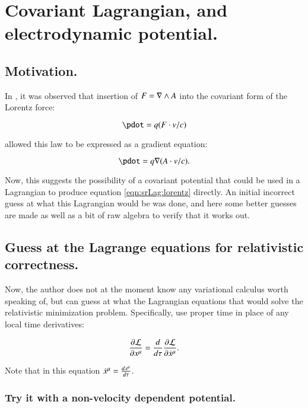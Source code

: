 \chapter{Covariant Lagrangian, and electrodynamic potential.}\label{chap:PJSrLagrangian}
\date{August 21, 2008.  srLagrangian.tex}

\section{Motivation. }

In , it was observed that insertion of $F = \nabla \wedge A$ into
the covariant form of the Lorentz force:

\begin{equation}\label{eqn:srLag:lorentz}
\pdot = q (F \cdot v/c)
\end{equation}

allowed this law to be expressed as a gradient equation:

\begin{equation}
\pdot = q \grad (A \cdot v/c).
\end{equation}

Now, this suggests the possibility of a covariant potential that could be 
used in a Lagrangian to produce equation \ref{eqn:srLag:lorentz} directly.  An
initial incorrect guess at what this Lagrangian would be was done, and
here some better guesses are made as well as a bit of raw algebra to verify
that it works out.

\section{Guess at the Lagrange equations for relativistic correctness. }

Now, the author does not at the moment know any variational calculus worth
speaking of, but can guess at what the Lagrangian equations that would 
solve the relativistic minimization problem.  Specifically, use proper
time in place of any local time derivatives:

\begin{equation}\label{eqn:srLag:properLagrange}
\frac{\partial \mathcal{L}}{\partial x^{\mu}} = 
\frac{d}{d\tau} \frac{\partial \mathcal{L}}{\partial \dot{x}^{\mu}}.
\end{equation}

Note that in this equation $\dot{x}^{\mu} = \frac{d x^{\mu}}{d\tau}$.

\subsection{Try it with a non-velocity dependent potential. }

